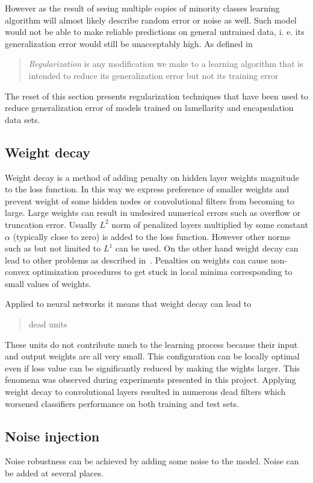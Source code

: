 \documentclass[a4paper, 11pt, table]{article}
\begin{document}
However as the result of seeing multiple copies of minority classes learning algorithm will almost likely describe random error or noise as well. Such model would not be able to make reliable predictions on general untrained data, i. e. its generalization error would still be unacceptably high. As defined in~\cite{dl_book} \blockquote{\textit{Regularization} is any modification we make to a learning algorithm that is intended to reduce its generalization error but not its training error}.

The reset of this section presents regularization techniques that have been used to reduce generalization error of models trained on lamellarity and encapsulation data sets.

\subsection{Weight decay}
Weight decay is a method of adding penalty on hidden layer weights magnitude to the loss function. In this way we express preference of smaller weights and prevent weight of some hidden nodes or convolutional filters from becoming to large. Large weights can result in undesired numerical errors such as overflow or truncation error. Usually $L^2$ norm of penalized layers multiplied by some constant $\alpha$ (typically close to zero) is added to the loss function. However other norms such as but not limited to $L^1$ can be used. 
On the other hand weight decay can lead to other problems as described in~\cite{dl_book}. Penalties on weights can cause non-convex optimization procedures to get stuck in local minima corresponding to small values of weights. 

Applied to neural networks it means that weight decay can lead to \blockquote{dead units}. These units do not contribute much to the learning process because their input and output weights are all very small. This configuration can be locally optimal even if loss value can be significantly reduced by making the wights larger. This fenomena was observed during experiments presented in this project. Applying weight decay to convolutional layers resulted in numerous dead filters which worsened classifiers performance on both training and test sets.

\subsection{Noise injection}
Noise robustness can be achieved by adding some noise to the model. Noise can be added at several places. 
\end{document}
